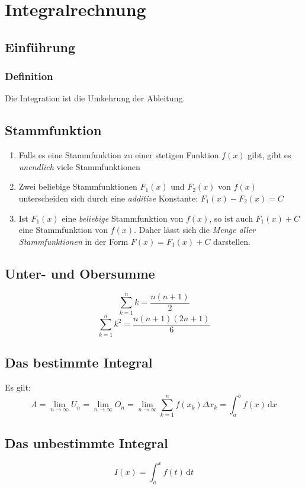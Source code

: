 \documentclass[a4paper,DIV10,12pt,headsepline,smallheadings,halfparskip-]{scrreprt}
\begin{document}
	\chapter{Integralrechnung}
	\section{Einführung} %
	\label{sec:einführung}
	\subsection{Definition} %
	\label{sub:definition}
	Die Integration ist die Umkehrung der Ableitung.
	\section{Stammfunktion} %
	\label{sub:stammfunktion}
	\begin{enumerate}
		\item Falls es eine Stammfunktion zu einer stetigen Funktion \(f(x)\) gibt, gibt es \emph{unendlich} viele Stammfunktionen
		\item Zwei beliebige Stammfunktionen \(F_1 (x)\) und \(F_2 (x)\) von \(f(x)\) unterscheiden sich durch eine \emph{additive} Konstante: \(F_1 (x) - F_2 (x) = C\)
		\item Ist \(F_1 (x)\) eine \emph{beliebige} Stammfunktion von \(f (x)\), so ist auch \(F_1 (x) + C\) eine Stammfunktion von \(f (x)\). Daher lässt sich die \emph{Menge aller Stammfunktionen} in der Form \(F(x) = F_1 (x) + C \) darstellen.
	\end{enumerate}
	\section{Unter- und Obersumme}
	\[ \sum_{k=1}^{n} k = \frac{n(n+1)}{2} \]
	\[ \sum_{k=1}^{n} k^2 = \frac{n(n+1)(2n+1)}{6} \]

	\section{Das bestimmte Integral} %
	\label{sub:das_bestimmte_integral}
	Es gilt:\newline
	\[A = \lim\limits_{n \rightarrow \infty}U_n = \lim\limits_{n \rightarrow \infty}O_n = \lim\limits_{n \rightarrow \infty}\sum_{k=1}^{n} f(x_k) \Delta x_k = \int_a^b f(x)\,\mathrm{d}x \]

	\section{Das unbestimmte Integral} %
	\label{sec:das_unbestimmte_integral}
	\[ I(x) = \int_a^x f(t)\,\mathrm{d}t \]
\end{document}
